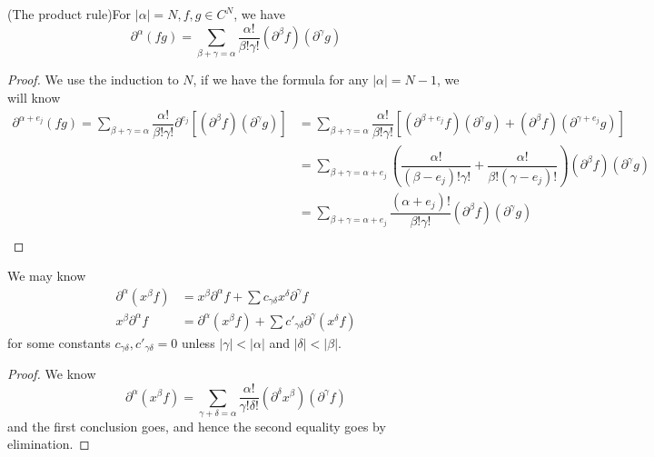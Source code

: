 \begin{proposition}
    (The product rule)For $|\alpha| = N, f,g\in C^N$, we have
    \[
    \partial^{\alpha}(fg) = \sum\limits_{\beta + \gamma = \alpha}\dfrac{\alpha!}{\beta!\gamma!}(\partial^{\beta}f)(\partial^{\gamma}g)
    \]
\end{proposition}
\begin{proof}
    We use the induction to $N$, if we have the formula for any $|\alpha| = N-1$, we will know
    \[
    \begin{aligned}
    \partial^{\alpha+e_j}(fg) = \sum\limits_{\beta + \gamma = \alpha}\dfrac{\alpha!}{\beta!\gamma!}\partial^{e_j}[(\partial^{\beta}f)(\partial^{\gamma}g)]  &= \sum\limits_{\beta + \gamma = \alpha}\dfrac{\alpha!}{\beta!\gamma!}[(\partial^{\beta+e_j}f)(\partial^{\gamma}g)+(\partial^{\beta}f)(\partial^{\gamma+e_j}g)] \\
    & = \sum\limits_{\beta + \gamma = \alpha+e_j}(\dfrac{\alpha!}{(\beta-e_j)!\gamma!}+\dfrac{\alpha!}{\beta!(\gamma-e_j)!})(\partial^{\beta}f)(\partial^{\gamma}g) \\
    & = \sum\limits_{\beta + \gamma = \alpha+e_j}\dfrac{(\alpha+e_j)!}{\beta!\gamma!}(\partial^{\beta}f)(\partial^{\gamma}g) \\
    \end{aligned}
    \]
\end{proof}

\begin{corollary}
    We may know
    \[
    \begin{aligned}
        \partial^{\alpha}(x^{\beta}f) &= x^{\beta}\partial^{\alpha}f + \sum c_{\gamma\delta}x^{\delta}\partial^{\gamma}f \\
        x^{\beta}\partial^{\alpha}f &= \partial^{\alpha}(x^{\beta}f) + \sum c'_{\gamma\delta}\partial^{\gamma}(x^{\delta}f)
    \end{aligned}
    \]
    for some constants $c_{\gamma\delta},c'_{\gamma\delta} = 0$ unless $|\gamma|<|\alpha|$ and $|\delta|<|\beta|$.
\end{corollary}
\begin{proof}
    We know
    \[
    \partial^{\alpha}(x^{\beta}f) = \sum\limits_{\gamma + \delta = \alpha}\dfrac{\alpha!}{\gamma!\delta!}(\partial^{\delta}x^{\beta})(\partial^{\gamma}f)
    \]
    and the first conclusion goes, and hence the second equality goes by elimination.
\end{proof}

